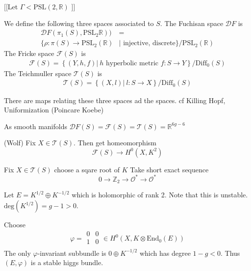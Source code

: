 [[Let $ \Gamma < \mathrm{PSL}(2, \mathbb{R}) $ ]]


We define the following three spaces associated to $S$.
The Fuchisan space $ \mathcal{D}F$ is 
\begin{align}
    \mathcal{D} F ( \pi_1 ( S) , \mathrm{PSL}_2 \mathbb{R} ) ) & = \\
    \{ \rho : \pi ( S)  \rightarrow  \mathrm{PSL}_2( \mathbb{R} ) & | \mbox{ injective, discrete} \} /\mathrm{PSL}_2 (\mathbb{R} ) 
\end{align}
The Fricke space $\mathcal{F}(S)$ is
\begin{align}
    \mathcal{F} ( S)  = \left\{ ( Y, h, f) |~ h \mbox{ hyperbolic metric } f:S \rightarrow Y \right\} / \mathrm{Diff}_0 ( S)  
\end{align}
The Teichmuller space $\mathcal{T}(S)$ is
\begin{align}
    \mathcal{T}(S)  = \left\{ ( X, l ) |~ l: S \rightarrow X  \right \}  / \mathrm{Diff}_0 ( S)  
\end{align}

There are maps relating these three spaces ad the spaces. 
cf Killing Hopf, Uniformization (Poincare Koebe) 

\begin{theorem}
As smooth manifolds $ \mathcal{D} F (S) = \mathcal{F} (S) = \mathcal{T} (S) = \mathbb{R}  ^{ 6g-6} $
\end{theorem}

\begin{theorem}
 (Wolf) 
    Fix $ X \in \mathcal{T} (S) $. 
    Then get homeomorphism 
    \begin{equation}
        \mathcal{F} (S) \rightarrow H^0 (X, K^2) 
    \end{equation}
\end{theorem}

Fix $ X \in \mathcal{T} ( S) $ choose a sqare root of $ K$ 
Take short exact sequence
\begin{equation}
    0 \rightarrow  \mathbb{Z} _2 \rightarrow \mathcal{O}^* \rightarrow \mathcal{O}^* 
\end{equation}

Let $ E = K^{1/2} \oplus K^{-1/2}$ which is holomorphic of rank 2. 
Note that this is unstable.
$ \mathrm{deg} ( K^{1/2} ) = g -1  > 0 $. 

Choose 
\begin{equation}
    \varphi = \begin{array}{rr}
        0 & 0 \\
        1 & 0 \\
    \end{array} \in H^0 ( X, K \otimes \mathrm{End}_ 0 ( E))
\end{equation}
The only $ \varphi$-invariant subbundle is $ 0 \oplus K^{-1/2} $ 
which has degree $ 1-g < 0 $. 
Thus $ ( E, \varphi ) $ is a stable higgs bundle. 

